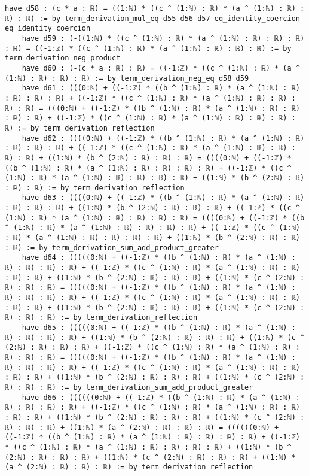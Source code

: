 \documentclass{article}
\begin{document}
\begin{tcolorbox}[colback=white!10, width=\linewidth]
\begin{lstlisting}[language=Lean4]
    have d58 : (c * a : ℝ) = ((1:ℕ) * ((c ^ (1:ℕ) : ℝ) * (a ^ (1:ℕ) : ℝ) : ℝ) : ℝ) := by term_derivation_mul_eq d55 d56 d57 eq_identity_coercion eq_identity_coercion
    have d59 : (-((1:ℕ) * ((c ^ (1:ℕ) : ℝ) * (a ^ (1:ℕ) : ℝ) : ℝ) : ℝ) : ℝ) = ((-1:ℤ) * ((c ^ (1:ℕ) : ℝ) * (a ^ (1:ℕ) : ℝ) : ℝ) : ℝ) := by term_derivation_neg_product
    have d60 : (-(c * a : ℝ) : ℝ) = ((-1:ℤ) * ((c ^ (1:ℕ) : ℝ) * (a ^ (1:ℕ) : ℝ) : ℝ) : ℝ) := by term_derivation_neg_eq d58 d59
    have d61 : (((0:ℕ) + ((-1:ℤ) * ((b ^ (1:ℕ) : ℝ) * (a ^ (1:ℕ) : ℝ) : ℝ) : ℝ) : ℝ) + ((-1:ℤ) * ((c ^ (1:ℕ) : ℝ) * (a ^ (1:ℕ) : ℝ) : ℝ) : ℝ) : ℝ) = (((0:ℕ) + ((-1:ℤ) * ((b ^ (1:ℕ) : ℝ) * (a ^ (1:ℕ) : ℝ) : ℝ) : ℝ) : ℝ) + ((-1:ℤ) * ((c ^ (1:ℕ) : ℝ) * (a ^ (1:ℕ) : ℝ) : ℝ) : ℝ) : ℝ) := by term_derivation_reflection
    have d62 : ((((0:ℕ) + ((-1:ℤ) * ((b ^ (1:ℕ) : ℝ) * (a ^ (1:ℕ) : ℝ) : ℝ) : ℝ) : ℝ) + ((-1:ℤ) * ((c ^ (1:ℕ) : ℝ) * (a ^ (1:ℕ) : ℝ) : ℝ) : ℝ) : ℝ) + ((1:ℕ) * (b ^ (2:ℕ) : ℝ) : ℝ) : ℝ) = ((((0:ℕ) + ((-1:ℤ) * ((b ^ (1:ℕ) : ℝ) * (a ^ (1:ℕ) : ℝ) : ℝ) : ℝ) : ℝ) + ((-1:ℤ) * ((c ^ (1:ℕ) : ℝ) * (a ^ (1:ℕ) : ℝ) : ℝ) : ℝ) : ℝ) + ((1:ℕ) * (b ^ (2:ℕ) : ℝ) : ℝ) : ℝ) := by term_derivation_reflection
    have d63 : ((((0:ℕ) + ((-1:ℤ) * ((b ^ (1:ℕ) : ℝ) * (a ^ (1:ℕ) : ℝ) : ℝ) : ℝ) : ℝ) + ((1:ℕ) * (b ^ (2:ℕ) : ℝ) : ℝ) : ℝ) + ((-1:ℤ) * ((c ^ (1:ℕ) : ℝ) * (a ^ (1:ℕ) : ℝ) : ℝ) : ℝ) : ℝ) = ((((0:ℕ) + ((-1:ℤ) * ((b ^ (1:ℕ) : ℝ) * (a ^ (1:ℕ) : ℝ) : ℝ) : ℝ) : ℝ) + ((-1:ℤ) * ((c ^ (1:ℕ) : ℝ) * (a ^ (1:ℕ) : ℝ) : ℝ) : ℝ) : ℝ) + ((1:ℕ) * (b ^ (2:ℕ) : ℝ) : ℝ) : ℝ) := by term_derivation_sum_add_product_greater
    have d64 : (((((0:ℕ) + ((-1:ℤ) * ((b ^ (1:ℕ) : ℝ) * (a ^ (1:ℕ) : ℝ) : ℝ) : ℝ) : ℝ) + ((-1:ℤ) * ((c ^ (1:ℕ) : ℝ) * (a ^ (1:ℕ) : ℝ) : ℝ) : ℝ) : ℝ) + ((1:ℕ) * (b ^ (2:ℕ) : ℝ) : ℝ) : ℝ) + ((1:ℕ) * (c ^ (2:ℕ) : ℝ) : ℝ) : ℝ) = (((((0:ℕ) + ((-1:ℤ) * ((b ^ (1:ℕ) : ℝ) * (a ^ (1:ℕ) : ℝ) : ℝ) : ℝ) : ℝ) + ((-1:ℤ) * ((c ^ (1:ℕ) : ℝ) * (a ^ (1:ℕ) : ℝ) : ℝ) : ℝ) : ℝ) + ((1:ℕ) * (b ^ (2:ℕ) : ℝ) : ℝ) : ℝ) + ((1:ℕ) * (c ^ (2:ℕ) : ℝ) : ℝ) : ℝ) := by term_derivation_reflection
    have d65 : (((((0:ℕ) + ((-1:ℤ) * ((b ^ (1:ℕ) : ℝ) * (a ^ (1:ℕ) : ℝ) : ℝ) : ℝ) : ℝ) + ((1:ℕ) * (b ^ (2:ℕ) : ℝ) : ℝ) : ℝ) + ((1:ℕ) * (c ^ (2:ℕ) : ℝ) : ℝ) : ℝ) + ((-1:ℤ) * ((c ^ (1:ℕ) : ℝ) * (a ^ (1:ℕ) : ℝ) : ℝ) : ℝ) : ℝ) = (((((0:ℕ) + ((-1:ℤ) * ((b ^ (1:ℕ) : ℝ) * (a ^ (1:ℕ) : ℝ) : ℝ) : ℝ) : ℝ) + ((-1:ℤ) * ((c ^ (1:ℕ) : ℝ) * (a ^ (1:ℕ) : ℝ) : ℝ) : ℝ) : ℝ) + ((1:ℕ) * (b ^ (2:ℕ) : ℝ) : ℝ) : ℝ) + ((1:ℕ) * (c ^ (2:ℕ) : ℝ) : ℝ) : ℝ) := by term_derivation_sum_add_product_greater
    have d66 : ((((((0:ℕ) + ((-1:ℤ) * ((b ^ (1:ℕ) : ℝ) * (a ^ (1:ℕ) : ℝ) : ℝ) : ℝ) : ℝ) + ((-1:ℤ) * ((c ^ (1:ℕ) : ℝ) * (a ^ (1:ℕ) : ℝ) : ℝ) : ℝ) : ℝ) + ((1:ℕ) * (b ^ (2:ℕ) : ℝ) : ℝ) : ℝ) + ((1:ℕ) * (c ^ (2:ℕ) : ℝ) : ℝ) : ℝ) + ((1:ℕ) * (a ^ (2:ℕ) : ℝ) : ℝ) : ℝ) = ((((((0:ℕ) + ((-1:ℤ) * ((b ^ (1:ℕ) : ℝ) * (a ^ (1:ℕ) : ℝ) : ℝ) : ℝ) : ℝ) + ((-1:ℤ) * ((c ^ (1:ℕ) : ℝ) * (a ^ (1:ℕ) : ℝ) : ℝ) : ℝ) : ℝ) + ((1:ℕ) * (b ^ (2:ℕ) : ℝ) : ℝ) : ℝ) + ((1:ℕ) * (c ^ (2:ℕ) : ℝ) : ℝ) : ℝ) + ((1:ℕ) * (a ^ (2:ℕ) : ℝ) : ℝ) : ℝ) := by term_derivation_reflection

\end{lstlisting}
\end{tcolorbox}
\end{document}
